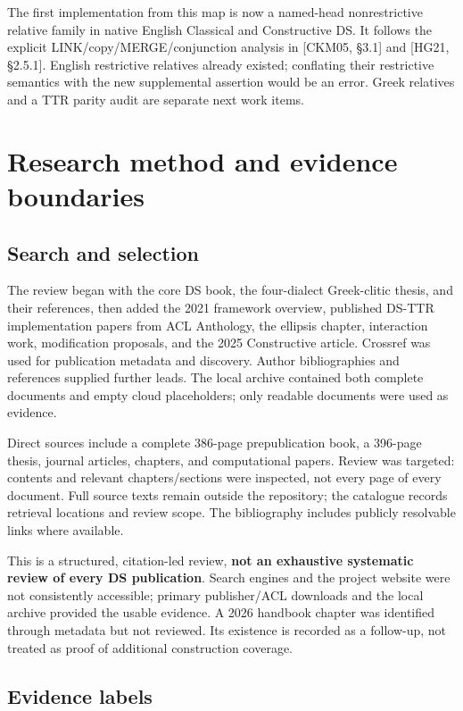 \documentclass[11pt,a4paper]{article}
\begin{document}
The first implementation from this map is now a named-head
nonrestrictive relative family in native English Classical and
Constructive DS. It follows the explicit LINK/copy/MERGE/conjunction
analysis in {[}CKM05, §3.1{]} and {[}HG21, §2.5.1{]}. English
restrictive relatives already existed; conflating their restrictive
semantics with the new supplemental assertion would be an error. Greek
relatives and a TTR parity audit are separate next work items.

\section{Research method and evidence
boundaries}\label{research-method-and-evidence-boundaries}

\subsection{Search and selection}\label{search-and-selection}

The review began with the core DS book, the four-dialect Greek-clitic
thesis, and their references, then added the 2021 framework overview,
published DS-TTR implementation papers from ACL Anthology, the ellipsis
chapter, interaction work, modification proposals, and the 2025
Constructive article. Crossref was used for publication metadata and
discovery. Author bibliographies and references supplied further leads.
The local archive contained both complete documents and empty cloud
placeholders; only readable documents were used as evidence.

Direct sources include a complete 386-page prepublication book, a
396-page thesis, journal articles, chapters, and computational papers.
Review was targeted: contents and relevant chapters/sections were
inspected, not every page of every document. Full source texts remain
outside the repository; the catalogue records retrieval locations and
review scope. The bibliography includes publicly resolvable links where
available.

This is a structured, citation-led review, \textbf{not an exhaustive
systematic review of every DS publication}. Search engines and the
project website were not consistently accessible; primary publisher/ACL
downloads and the local archive provided the usable evidence. A 2026
handbook chapter was identified through metadata but not reviewed. Its
existence is recorded as a follow-up, not treated as proof of additional
construction coverage.

\subsection{Evidence labels}\label{evidence-labels}
\end{document}
